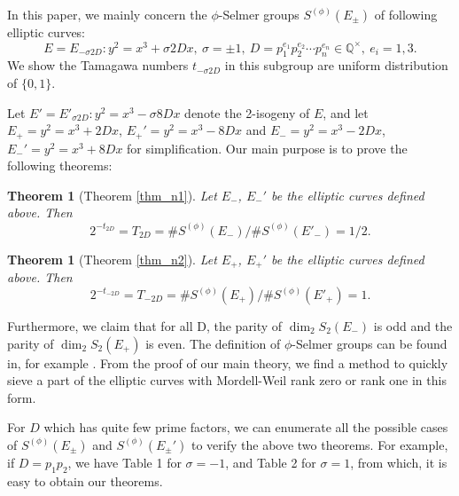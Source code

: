 \documentclass{amsart}
\numberwithin{equation}{section}
\theoremstyle{plain}
\newtheorem{thm_}[equation]{Theorem}
\theoremstyle{definition}
\newcommand{\thm}[1]{\begin{thm_}#1\end{thm_}}
\newcommand{\QQ}{\mathbb Q}
\begin{document}
In this paper, we mainly concern the $\phi$-Selmer groups $S^{({\phi})}({E_{\pm}})$ of following elliptic curves:
$$
E = E_{-\sigma2D}: y^2 = x^3 + \sigma2D x, \ \sigma = \pm 1, \  D = p_1^{e_1}p_2^{e_2}\cdots p_n^{e_n} \in \QQ^\times ,\ e_i = 1,3.
$$
We show the Tamagawa numbers $t_{-\sigma 2 D}$ in this subgroup are uniform distribution of $\{0,1\}$.

Let $E' = E'_{\sigma 2D}: y^2 = x^3 -\sigma 8D x$ denote the 2-isogeny of $E$, and let $E_+ = y^2 = x^3 + 2 D x$, $E_+' = y^2 = x^3 - 8 D x$ and $E_- = y^2 = x^3 - 2 D x$, $E_-' = y^2 = x^3 + 8 D x$ for simplification.
Our main purpose is to prove the following theorems:
\thm{[Theorem \ref{thm_n1}] \label{thm_1} Let $E_-$, $E_-'$ be the elliptic curves defined above. Then     $$2^{-t_{2D}} = T_{2D} = \# S^{(\phi)}(E_-)/\# S^{(\phi)}(E'_{-}) = 1/2.$$ 
}
\thm{[Theorem \ref{thm_n2}] \label{thm_2} Let $E_+$, $E_+'$ be the elliptic curves defined above. Then     $$2^{-t_{-2D}} = T_{-2D} = \# S^{(\phi)}(E_+)/\# S^{(\phi)}(E'_{+}) = 1.$$
}

Furthermore, we claim that for all D, the parity of $\dim_2 S_2(E_-)$ is odd and the parity of $\dim_2 S_2(E_+)$ is even.
The definition of $\phi$-Selmer groups can be found in, for example \cite{gtm106}. From the proof of our main theory, we find a method to quickly sieve a part of the elliptic curves with Mordell-Weil rank zero or rank one in this form.

For $D$ which has quite few prime factors, we can enumerate all the possible cases of $S^{(\phi)}(E_\pm)$ and $S^{({\phi})}({E_\pm'})$ to verify the above two theorems. For example, if $D = p_{1}p_{2}$, we have Table 1 for $\sigma = -1$, and Table 2 for $\sigma = 1$, from which, it is easy to obtain our theorems.
\end{document}
